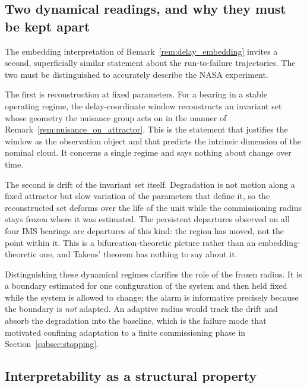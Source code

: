 \documentclass[a4paper]{cas-sc}
\begin{document}
\subsection{Two dynamical readings, and why they must be kept apart}
\label{subsec:disc_dynamics}

The embedding interpretation of Remark~\ref{rem:delay_embedding} invites a second,
superficially similar statement about the run-to-failure trajectories. The
two must be distinguished to accurately describe the NASA experiment.

The first is reconstruction at fixed parameters. For a bearing in a stable
operating regime, the delay-coordinate window reconstructs an invariant set
whose geometry the nuisance group acts on in the manner of
Remark~\ref{rem:nuisance_on_attractor}. This is the statement that justifies
the window as the observation object and that predicts the intrinsic dimension
of the nominal cloud. It concerns a single regime and says nothing about
change over time.

The second is drift of the invariant set itself. Degradation is not motion
along a fixed attractor but slow variation of the parameters that define it,
so the reconstructed set deforms over the life of the unit while the
commissioning radius stays frozen where it was estimated. The persistent
departures observed on all four IMS bearings are departures of this kind: the
region has moved, not the point within it. This is a bifurcation-theoretic
picture rather than an embedding-theoretic one, and Takens' theorem has
nothing to say about it.

Distinguishing these dynamical regimes clarifies the role of the frozen radius. It is a
boundary estimated for one configuration of the system and then held fixed
while the system is allowed to change; the alarm is informative precisely
because the boundary is \emph{not} adapted. An adaptive radius would track the
drift and absorb the degradation into the baseline, which is the failure mode
that motivated confining adaptation to a finite commissioning phase in
Section~\ref{subsec:stopping}.

\subsection{Interpretability as a structural property}
\label{subsec:disc_interpretability}
\end{document}
